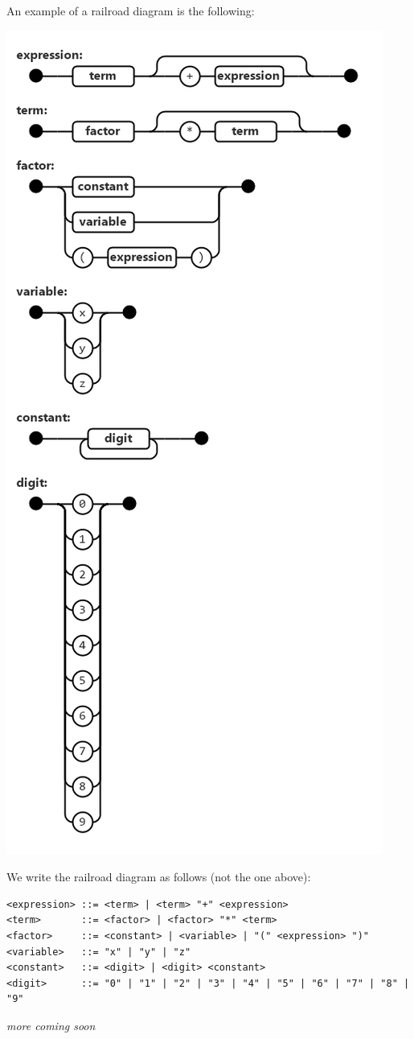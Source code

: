 \documentclass[11pt]{article}
\begin{document}
An example of a railroad diagram is the following:

\begin{center}
\includegraphics[width=.9\linewidth]{Grammars/2022-12-06_17-15-45_Syntax-diagram-example.png}
\end{center}

We write the railroad diagram as follows (not the one above):

\begin{verbatim}
<expression> ::= <term> | <term> "+" <expression>
<term>       ::= <factor> | <factor> "*" <term>
<factor>     ::= <constant> | <variable> | "(" <expression> ")"
<variable>   ::= "x" | "y" | "z"
<constant>   ::= <digit> | <digit> <constant>
<digit>      ::= "0" | "1" | "2" | "3" | "4" | "5" | "6" | "7" | "8" | "9"
\end{verbatim}


\emph{more coming soon}
\end{document}
